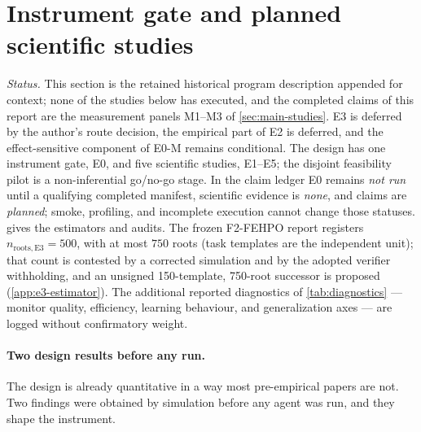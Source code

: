 \section{Instrument gate and planned scientific studies}
\label{sec:experiments}

\emph{Status.} This section is the retained historical program description
appended for context; none of the studies below has executed, and the completed
claims of this report are the measurement panels M1--M3 of
\cref{sec:main-studies}.  E3 is deferred by the author's route decision, the
empirical part of E2 is deferred, and the effect-sensitive component of E0-M
remains conditional.  The design has one instrument gate, E0, and five
scientific studies, E1--E5; the disjoint feasibility pilot is a non-inferential
go/no-go stage.  In the
claim ledger E0 remains \emph{not run} until a qualifying completed manifest,
scientific evidence is \emph{none}, and claims are \emph{planned}; smoke,
profiling, and incomplete execution cannot change those statuses.
 gives the estimators and audits.  The frozen F2-FEHPO report
registers $n_{\mathrm{roots,E3}}=500$, with at most $750$ roots (task templates are
the independent unit); that
count is contested by a corrected simulation and by the adopted verifier
withholding, and an unsigned 150-template, 750-root successor is proposed
(\cref{app:e3-estimator}).  The additional reported
diagnostics of \cref{tab:diagnostics} --- monitor quality, efficiency, learning
behaviour, and generalization axes --- are logged without confirmatory weight.

\paragraph{Two design results before any run.}
The design is already quantitative in a way most pre-empirical papers are not.
Two findings were obtained by simulation before any agent was run, and they
shape the instrument.

